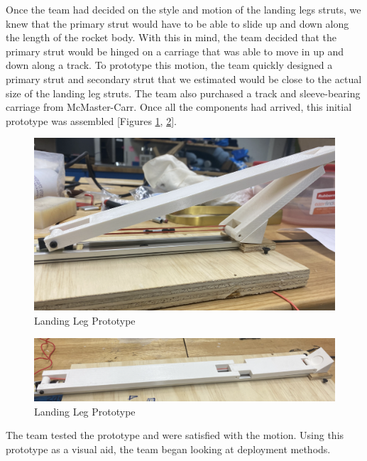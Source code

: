 Once the team had decided on the style and motion of the landing legs struts, we knew that the primary strut would have to be able to slide up and down along the length of the rocket body. With this in mind, the team decided that the primary strut would be hinged on a carriage that was able to move in up and down along a track. To prototype this motion, the team quickly designed a primary strut and secondary strut that we estimated would be close to the actual size of the landing leg struts. The team also purchased a track and sleeve-bearing carriage from McMaster-Carr. Once all the components had arrived, this initial prototype was assembled [Figures \ref{figs:llp1}, \ref{figs:llp2}]. 

\begin{figure}[H]
\centering
\includegraphics[scale=0.8]{src/figs/landinglegprototype1.png}
\caption{Landing Leg Prototype}
\label{figs:llp1}
\end{figure}

\begin{figure}[H]
\centering
\includegraphics[scale=0.8]{src/figs/landinglegprototype1secondview.png}
\caption{Landing Leg Prototype}
\label{figs:llp2}
\end{figure}

The team tested the prototype and were satisfied with the motion. Using this prototype as a visual aid, the team began looking at deployment methods.

